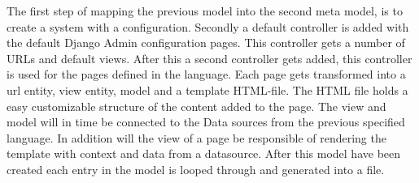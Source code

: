 The first step of mapping the previous model into the second meta model, is to create a system with a configuration. 
Secondly a default controller is added with the default Django Admin configuration pages. 
This controller gets a number of URLs and default views. 
After this a second controller gets added, this controller is used for the pages defined in the language. 
Each page gets transformed into a url entity, view entity, model and a template HTML-file.
The HTML file holds a easy customizable structure of the content added to the page. The view and model will in time be connected to the Data sources from the previous specified language. 
In addition will the view of a page be responsible of rendering the template with context and data from a datasource. 
After this model have been created each entry in the model is looped through and generated into a file.

